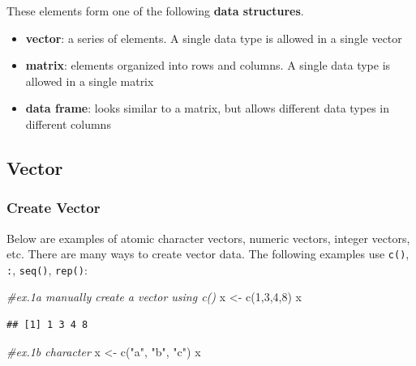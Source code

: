\documentclass[
]{article}
\newenvironment{Shaded}{\begin{snugshade}}{\end{snugshade}}
\newcommand{\CommentTok}[1]{\textcolor[rgb]{0.56,0.35,0.01}{\textit{#1}}}
\newcommand{\DecValTok}[1]{\textcolor[rgb]{0.00,0.00,0.81}{#1}}
\newcommand{\FunctionTok}[1]{\textcolor[rgb]{0.00,0.00,0.00}{#1}}
\newcommand{\NormalTok}[1]{#1}
\newcommand{\OtherTok}[1]{\textcolor[rgb]{0.56,0.35,0.01}{#1}}
\newcommand{\StringTok}[1]{\textcolor[rgb]{0.31,0.60,0.02}{#1}}
\providecommand{\tightlist}{%
  \setlength{\itemsep}{0pt}\setlength{\parskip}{0pt}}
\begin{document}
These elements form one of the following \textbf{data structures}.

\begin{itemize}
\tightlist
\item
  \textbf{vector}: a series of elements. A single data type is allowed in a single vector
\item
  \textbf{matrix}: elements organized into rows and columns. A single data type is allowed in a single matrix
\item
  \textbf{data frame}: looks similar to a matrix, but allows different data types in different columns
\end{itemize}

\hypertarget{vector}{%
\subsection{Vector}\label{vector}}

\hypertarget{create-vector}{%
\subsubsection{Create Vector}\label{create-vector}}

Below are examples of atomic character vectors, numeric vectors, integer vectors, etc. There are many ways to create vector data. The following examples use \texttt{c()}, \texttt{:}, \texttt{seq()}, \texttt{rep()}:

\begin{Shaded}
\begin{Highlighting}[]
\CommentTok{\#ex.1a manually create a vector using c()}
\NormalTok{x }\OtherTok{\textless{}{-}} \FunctionTok{c}\NormalTok{(}\DecValTok{1}\NormalTok{,}\DecValTok{3}\NormalTok{,}\DecValTok{4}\NormalTok{,}\DecValTok{8}\NormalTok{)}
\NormalTok{x}
\end{Highlighting}
\end{Shaded}

\begin{verbatim}
## [1] 1 3 4 8
\end{verbatim}

\begin{Shaded}
\begin{Highlighting}[]
\CommentTok{\#ex.1b character}
\NormalTok{x }\OtherTok{\textless{}{-}} \FunctionTok{c}\NormalTok{(}\StringTok{"a"}\NormalTok{, }\StringTok{"b"}\NormalTok{, }\StringTok{"c"}\NormalTok{)}
\NormalTok{x}
\end{Highlighting}
\end{Shaded}
\end{document}
